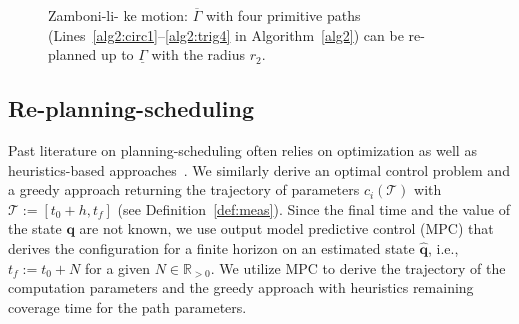\documentclass[letterpaper,10pt,conference,twoside]{IEEEtran}
\newcommand{\figpath}{./figures}
\theoremstyle{definition}
\begin{document}
\begin{figure}[t]
  \vspace*{-1ex}
  \footnotesize
  \begin{minipage}[l]{0.7\columnwidth}
    \centering
    
  \end{minipage}\hfill
  \begin{minipage}[l]{0.26\columnwidth}
    \caption{Zamboni-li- ke motion: $\overline{\Gamma}$ with four primitive paths (Lines~\ref{alg2:circ1}--\ref{alg2:trig4} in Algorithm~\ref{alg2}) can be re-planned up to $\underline{\Gamma}$ {\color{black}with the radius} $r_2$.%
    }
    \label{fig:zambo}
  \end{minipage}
  \vspace*{-5ex}
\end{figure}

\subsection{Re-planning-scheduling}
\label{sec:repla-algo}

Past literature on planning-scheduling often relies on %
optimization {\color{black} as well as heuristics-based} approaches~\cite{brateman2006energy,zhang2007low,ondruska2015scheduled,lahijanian2018resource}. We similarly derive an optimal control problem {\color{black}and a greedy approach} returning the trajectory of parameters $c_i(\mathcal{T})$ with $\mathcal{T}:=[t_0+h,t_f]$ (see Definition~\ref{def:meas}). Since the final time %
and the %
value of the state $\mathbf{q}$ are not known, we use %
output model predictive control (MPC) that derives the configuration for a finite horizon on an estimated state $\hat{\mathbf{q}}$, i.e., $t_f:=t_0+N$ for a given $N\in\mathbb{R}_{>0}$. %
{\color{black} We utilize MPC to derive the trajectory of the computation parameters and the greedy approach with heuristics remaining coverage time for the path parameters.}
\end{document}
